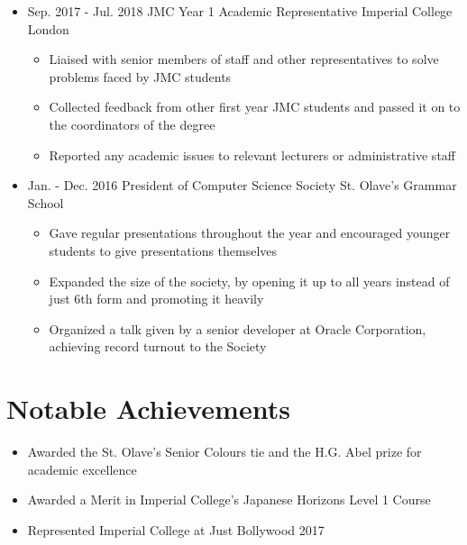 \documentclass[11pt,a4paper,sans]{moderncv}        %
\begin{document}
\begin{itemize}

\item{
\cventry
{Sep. 2017 - Jul. 2018}
{JMC Year 1 Academic Representative}
{Imperial College London}
{}{}{
\begin{itemize}
\item Liaised with senior members of staff and other representatives to solve problems faced by JMC students
\item Collected feedback from other first year JMC students and passed it on to the coordinators of the degree
\item Reported any academic issues to relevant lecturers or administrative staff
\end{itemize}
}}

\item{
\cventry
{Jan. - Dec. 2016}
{President of Computer Science Society}
{St. Olave's Grammar School}
{}{}{
\begin{itemize}
\item Gave regular presentations throughout the year and encouraged younger students to give presentations themselves
\item Expanded the size of the society, by opening it up to all years instead of just 6th form and promoting it heavily
\item Organized a talk given by a senior developer at Oracle Corporation, achieving record turnout to the Society
\end{itemize}
}}

\end{itemize}

\section{Notable Achievements}

\begin{itemize}

\item Awarded the St. Olave's Senior Colours tie and the H.G. Abel prize for academic excellence

\item Awarded a Merit in Imperial College's Japanese Horizons Level 1 Course

\item Represented Imperial College at Just Bollywood 2017

\end{itemize}

\nocite{*}

\end{document}
